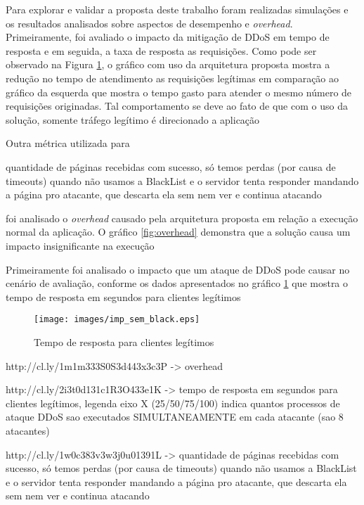 
Para explorar e validar a proposta deste trabalho foram realizadas simulações e os resultados analisados sobre aspectos de desempenho e \emph{overhead}. Primeiramente, foi avaliado o impacto da mitigação de DDoS em tempo de resposta e em seguida, a taxa de resposta as requisições. Como pode ser observado na Figura \ref{fig:imp_sem_black}, o gráfico com uso da arquitetura proposta mostra a redução no tempo de atendimento as requisições legítimas em comparação ao gráfico da esquerda que mostra o tempo gasto para atender o mesmo número de requisições originadas. Tal comportamento se deve ao fato de que com o uso da solução, somente tráfego legítimo é direcionado a aplicação  

Outra métrica utilizada para 

quantidade de páginas recebidas com sucesso, só temos perdas (por causa de timeouts) quando não usamos a BlackList e o servidor tenta responder mandando a página pro atacante, que descarta ela sem nem ver e continua atacando


foi analisado o \emph{overhead} causado pela arquitetura proposta em relação a execução normal da aplicação. O gráfico \ref{fig:overhead} demonstra que a solução causa um impacto insignificante na execução 

Primeiramente foi analisado o impacto que um ataque de DDoS pode causar no cenário de avaliação, conforme os dados apresentados no gráfico \ref{fig:imp_sem_black} que mostra o tempo de resposta em segundos para clientes legítimos

\begin{figure}[h!]
\centering
\texttt{[image: images/imp\_sem\_black.eps]}
\caption{Tempo de resposta para clientes legítimos}
\label{fig:imp_sem_black}
\end{figure}

http://cl.ly/1m1m333S0S3d443x3c3P -> overhead



http://cl.ly/2i3t0d131c1R3O433e1K -> tempo de resposta em segundos para clientes legítimos, legenda eixo X (25/50/75/100) indica quantos processos de ataque DDoS sao executados SIMULTANEAMENTE em cada atacante (sao 8 atacantes)



http://cl.ly/1w0c383v3w3j0u01391L -> quantidade de páginas recebidas com sucesso, só temos perdas (por causa de timeouts) quando não usamos a BlackList e o servidor tenta responder mandando a página pro atacante, que descarta ela sem nem ver e continua atacando



